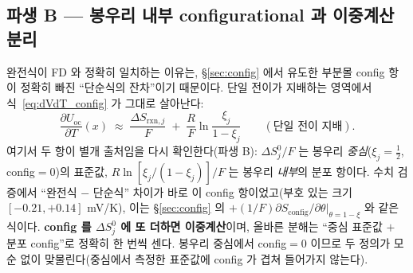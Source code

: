 \documentclass[11pt,a4paper]{article}
\newcommand{\rxn}{\mathrm{rxn}}
\newcommand{\oc}{\mathrm{oc}}
\newcommand{\config}{\mathrm{config}}
\begin{document}
\subsection{파생 B — 봉우리 내부 configurational 과 이중계산 분리}
완전식이 FD 와 정확히 일치하는 이유는, \S\ref{sec:config} 에서 유도한 부분몰 config 항이 정확히 빠진
``단순식의 잔차''이기 때문이다. 단일 전이가 지배하는 영역에서 식~\eqref{eq:dVdT_config} 가 그대로 살아난다:
\begin{equation}
\frac{\partial U_\oc}{\partial T}(x)\;\approx\;\frac{\Delta S_{\rxn,j}}{F}\;+\;\frac{R}{F}\ln\!\frac{\xi_j}{1-\xi_j}
\qquad(\text{단일 전이 지배}).
\label{eq:single_config}
\end{equation}
여기서 두 항이 별개 출처임을 다시 확인한다(파생 B): $\Delta S^0_j/F$ 는 봉우리 \emph{중심}($\xi_j=\tfrac12$,
config$=0$)의 표준값, $R\ln[\xi_j/(1-\xi_j)]/F$ 는 봉우리 \emph{내부}의 분포 항이다. 수치 검증에서 ``완전식
$-$ 단순식'' 차이가 바로 이 config 항이었고(부호 있는 크기 $[-0.21,+0.14]$ mV/K), 이는 \S\ref{sec:config} 의
$+(1/F)\partial S_\config/\partial\theta|_{\theta=1-\xi}$ 와 같은 식이다. \textbf{config 를 $\Delta S^0_j$ 에 또 더하면
이중계산}이며, 올바른 분해는 ``중심 표준값 $+$ 분포 config''로 정확히 한 번씩 센다. 봉우리 중심에서 config$=0$
이므로 두 정의가 모순 없이 맞물린다(중심에서 측정한 표준값에 config 가 겹쳐 들어가지 않는다).
\end{document}
